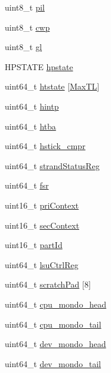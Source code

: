 \begin{DoxyCompactItemize}
uint8\_\-t \hyperlink{classSparcISA_1_1ISA_a66223bd530b4057219479647e23beed6}{pil}
\item 
uint8\_\-t \hyperlink{classSparcISA_1_1ISA_a58c702bc16d587a7bd7a38d609dea6d8}{cwp}
\item 
uint8\_\-t \hyperlink{classSparcISA_1_1ISA_a285fa13127daefc218bebcdb2437ad1a}{gl}
\item 
HPSTATE \hyperlink{classSparcISA_1_1ISA_ac750e45e1f2206dda9eb77b9abda8e1f}{hpstate}
\item 
uint64\_\-t \hyperlink{classSparcISA_1_1ISA_a5672f7d32a200a25344a957b6cf28bdd}{htstate} \mbox{[}\hyperlink{namespaceSparcISA_a8d6a6b2e04f9b3ebcec03466060ff24a}{MaxTL}\mbox{]}
\item 
uint64\_\-t \hyperlink{classSparcISA_1_1ISA_a80178c50623dd8f9e7cf81fdcb03a5a3}{hintp}
\item 
uint64\_\-t \hyperlink{classSparcISA_1_1ISA_a394227ebf5f2ab997956fe039b9d8c55}{htba}
\item 
uint64\_\-t \hyperlink{classSparcISA_1_1ISA_a79e2b19decd8bd9410d920d868b3e449}{hstick\_\-cmpr}
\item 
uint64\_\-t \hyperlink{classSparcISA_1_1ISA_ae6cd03a484c4fdb1182defef00b5c966}{strandStatusReg}
\item 
uint64\_\-t \hyperlink{classSparcISA_1_1ISA_a671452da0a617e5f667a200a620572e0}{fsr}
\item 
uint16\_\-t \hyperlink{classSparcISA_1_1ISA_a5fe352a7943e22456a05c5300a6a49ae}{priContext}
\item 
uint16\_\-t \hyperlink{classSparcISA_1_1ISA_a815fd20b8c74821c4bf2a9f0380b4d7f}{secContext}
\item 
uint16\_\-t \hyperlink{classSparcISA_1_1ISA_ae7345726b86ab42318467a52e4e1bfe8}{partId}
\item 
uint64\_\-t \hyperlink{classSparcISA_1_1ISA_a6e32b79603096a37834479deaa7964c1}{lsuCtrlReg}
\item 
uint64\_\-t \hyperlink{classSparcISA_1_1ISA_accdaadbaa1cb32c92b64de0ffb9d5dfe}{scratchPad} \mbox{[}8\mbox{]}
\item 
uint64\_\-t \hyperlink{classSparcISA_1_1ISA_acc2fabb40ae04b90d3d10c49327213e6}{cpu\_\-mondo\_\-head}
\item 
uint64\_\-t \hyperlink{classSparcISA_1_1ISA_a68772afbd190aea65a3a74d716801cc5}{cpu\_\-mondo\_\-tail}
\item 
uint64\_\-t \hyperlink{classSparcISA_1_1ISA_a5e058fd05845d4b8527d627e8fac70f8}{dev\_\-mondo\_\-head}
\item 
uint64\_\-t \hyperlink{classSparcISA_1_1ISA_a5a529b655214fffb3d1cff2c0d4eb1dd}{dev\_\-mondo\_\-tail}

\end{DoxyCompactItemize}
